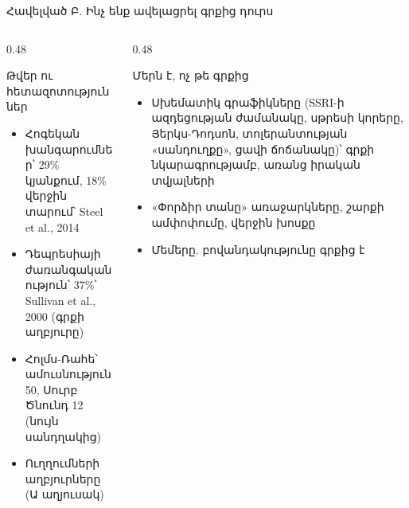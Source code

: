 \begin{frame}{Հավելված Բ. Ինչ ենք ավելացրել գրքից դուրս}
  \begin{columns}[T]
    \begin{column}{0.48\textwidth}
      \begin{card}[colback=mint!30!cardwhite, fontupper=\scriptsize]
        {\blackfont Թվեր ու հետազոտություններ}\par\smallskip
        \begin{itemize}\setlength{\itemsep}{0.5mm}
          \item Հոգեկան խանգարումներ՝ 29\% կյանքում, 18\% վերջին տարում՝ Steel et al., 2014
          \item Դեպրեսիայի ժառանգականություն՝ 37\%՝ Sullivan et al., 2000 (գրքի աղբյուրը)
          \item Հոլմս-Ռահե՝ ամուսնություն 50, Սուրբ Ծնունդ 12 (նույն սանդղակից)
          \item Ուղղումների աղբյուրները (Ա աղյուսակ)
        \end{itemize}
      \end{card}
    \end{column}
    \begin{column}{0.48\textwidth}
      \begin{card}[colback=peach!35!cardwhite, fontupper=\scriptsize]
        {\blackfont Մերն է, ոչ թե գրքից}\par\smallskip
        \begin{itemize}\setlength{\itemsep}{0.5mm}
          \item Սխեմատիկ գրաֆիկները (SSRI-ի ազդեցության ժամանակը, սթրեսի կորերը, Յերկս-Դոդսոն, տոլերանտության «սանդուղքը», ցավի ճոճանակը)՝ գրքի նկարագրությամբ, առանց իրական տվյալների
          \item «Փորձիր տանը» առաջարկները, շարքի ամփոփումը, վերջին խոսքը
          \item Մեմերը. բովանդակությունը գրքից է
        \end{itemize}
      \end{card}
    \end{column}
  \end{columns}
\end{frame}

